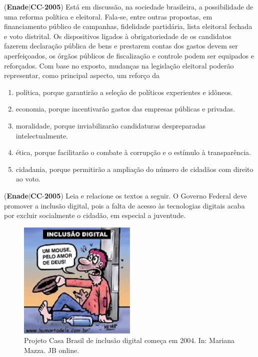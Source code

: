 \documentclass{exam}
\begin{document}
\begin{questions}

\question (\textbf{Enade}$|$\textbf{CC}-\textbf{2005}) Está em discussão, na sociedade brasileira, a possibilidade de uma
reforma política e eleitoral. Fala-se, entre outras propostas, em
financiamento público de campanhas, fidelidade partidária, lista
eleitoral fechada e voto distrital. Os dispositivos ligados à
obrigatoriedade de os candidatos fazerem declaração pública de
bens e prestarem contas dos gastos devem ser aperfeiçoados, os
órgãos públicos de fiscalização e controle podem ser equipados
e reforçados.
Com base no exposto, mudanças na legislação eleitoral poderão
representar, como principal aspecto, um reforço da
	\begin{enumerate}[label=\alph*)]
		\item  política, porque garantirão a seleção de políticos experientes e idôneos. 
		\item  economia, porque incentivarão gastos das empresas públicas e privadas. 
		\item  moralidade, porque inviabilizarão candidaturas despreparadas intelectualmente. 
		\item  ética, porque facilitarão o combate à corrupção e o estímulo à transparência. 
		\item  cidadania, porque permitirão a ampliação do número de cidadãos com direito ao voto.  
	\end{enumerate}

\question (\textbf{Enade}$|$\textbf{CC}-\textbf{2005}) Leia e relacione os textos a seguir.
O Governo Federal deve
promover a inclusão digital, pois
a falta de acesso às tecnologias
digitais acaba por excluir
socialmente o cidadão, em
especial a juventude.
\begin{figure}[Hhtb]
	\begin{center}
		\includegraphics[width=0.5\textwidth]{CIENCIA_DA_COMPUTACAO_Prova2005-utf8_figuras/fig-0001.jpg}
		\caption{Projeto Casa Brasil de inclusão digital começa em 2004. In: Mariana Mazza. JB online.}
	\end{center}
\end{figure}


\end{questions}
\end{document}

